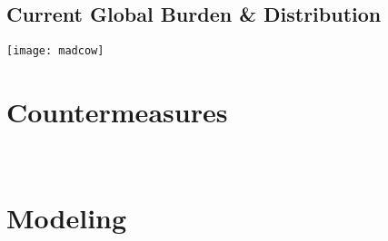 \documentclass{report}
\begin{document}
\section{Current Global Burden & Distribution}
\texttt{[image: madcow]}
\chapter{Countermeasures}

\chapter{Modeling}
\end{document}
